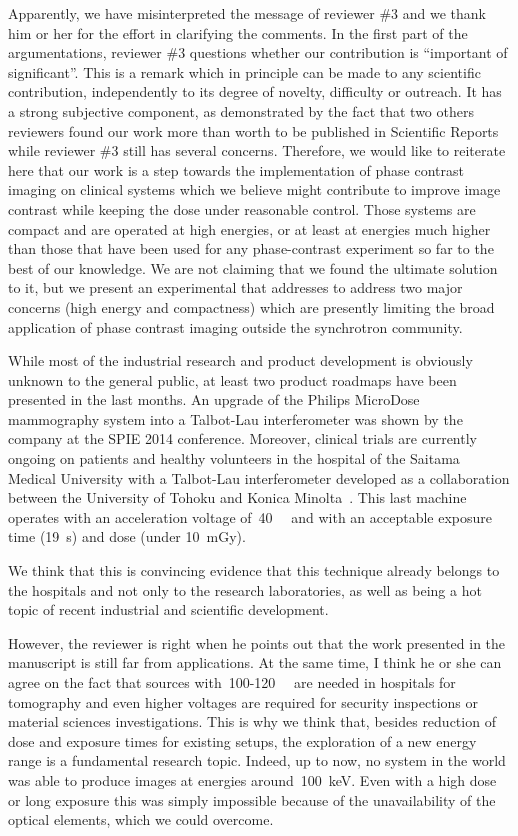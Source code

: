 \documentclass[a4paper,english]{scrartcl}
\begin{document}
Apparently, we have misinterpreted the message of reviewer \#3
and we thank him or her for the effort in clarifying the comments. In the
first part of the argumentations, reviewer \#3 questions whether our
contribution is ``important of significant''. This is a remark which in
principle can be made to any scientific contribution, independently to its
degree of novelty, difficulty or outreach. It has a strong subjective
component, as demonstrated by the fact that two others reviewers found our
work more than worth to be published in Scientific Reports while reviewer \#3 still has
several concerns. Therefore, we would like to reiterate here that our work
is a step towards the implementation of phase contrast imaging on clinical
systems which we believe might contribute to improve image contrast while
keeping the dose under reasonable control. Those systems are compact and are
operated at high energies, or at least at energies much higher than those
that have been used for any phase-contrast experiment so far to the best of
our knowledge. We are not claiming that we found the ultimate solution to
it, but we present an experimental that addresses to address two major concerns
(high energy and compactness) which are presently limiting the broad
application of phase contrast imaging outside the synchrotron community.

While most of the industrial research and product development is obviously
unknown to the general public, at least two product roadmaps have been presented in
the last months. An upgrade of the Philips MicroDose mammography system into a
Talbot-Lau interferometer was shown by the company at the SPIE
2014 conference\cite{Roessl2014,Roessl06032014}. Moreover, clinical trials are currently
ongoing on patients and healthy volunteers in the hospital of the Saitama
Medical University with a Talbot-Lau interferometer
developed as a collaboration between the University of Tohoku and Konica
Minolta~\cite{Momose06032014}. This last machine operates with an
acceleration voltage of~\SI{40}{\kilo\voltpeak} and with an acceptable
exposure time (\SI{19}{\second}) and dose (under \SI{10}{\milli\gray}).

We think that this is convincing evidence that this technique already belongs to the
hospitals and not only to the research laboratories, as well as being a hot
topic of recent industrial and scientific development.

However, the reviewer is right when he points out that the work presented in
the manuscript is still far from applications. At the same time, I think he
or she can agree on the fact that sources
with~\num{100}-\SI{120}{\kilo\voltpeak} are needed in
hospitals for tomography and even higher voltages are required for security
inspections or material sciences investigations.
This is why we think that, besides reduction of dose and exposure times for
existing setups, the exploration of a new energy range is a fundamental
research topic. Indeed, up to now, no system in the world was able to
produce images at energies around~\SI{100}{\kilo\eV}. Even with a high
dose or long exposure
this was simply impossible because of the unavailability of the optical
elements, which we could overcome.
\end{document}
